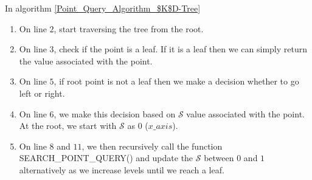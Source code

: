 In algorithm \ref{Point_Query_Algorithm_$K$D-Tree} 

\begin{enumerate}

    \item On line $2$, start traversing the tree from the root. 
    
    \item On line $3$, check if the point is a leaf. If it is a leaf then we can simply return the value associated with the point.
    
    \item On line $5$, if root point is not a leaf then we make a decision whether to go left or right.
    
    \item On line $6$, we make this decision based on $\mathcal{S}$ value associated with the point. At the root, we start with $\mathcal{S}$ as $0$ ($x\_axis$). 
    \item On line $8$ and $11$, we then recursively call the function SEARCH\_POINT\_QUERY() and update the $\mathcal{S}$ between $0$ and $1$ alternatively as we increase levels until we reach a leaf.

\end{enumerate}



